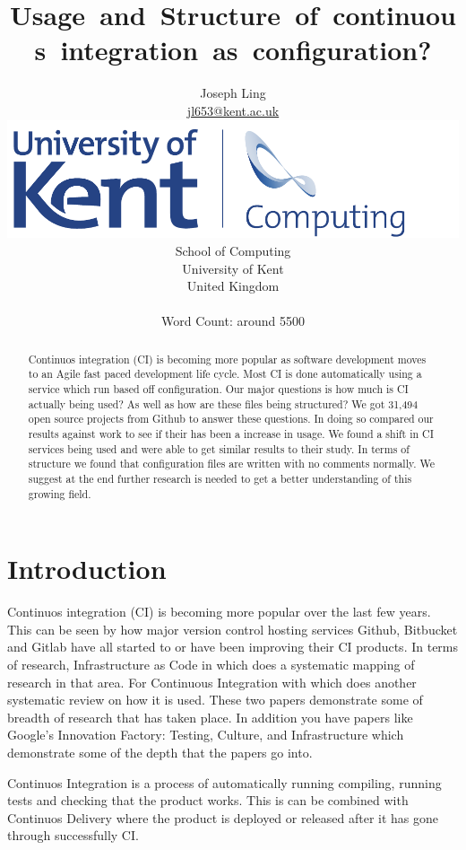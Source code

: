\documentclass[twoside,12pt,titlepage,a4paper]{article}
\title{Usage and Structure of continuous integration as configuration?}
\author{Joseph Ling\\\vspace{10mm}
\url{jl653@kent.ac.uk} \\ \vspace{5mm}
\includegraphics[scale=0.6]{Kent_Comp_294_RGB} \\
School of Computing \\
University of Kent \\
United Kingdom \\ \vspace{10mm} \\ Word Count: around 5500}
\begin{document}
\maketitle
\restoregeometry              %

\begin{abstract}
  Continuos integration (CI) is becoming more popular as software development moves to an Agile fast paced development life cycle. Most CI is done automatically using a service which run based off configuration. Our major questions is how much is CI actually being used? As well as how are these files being structured? We got 31,494 open source projects from Github to answer these questions. In doing so compared our results against \citet{Hilton2016} work to see if their has been a increase in usage. We found a shift in CI services being used and were able to get similar results to their study. In terms of structure we found that configuration files are written with no comments normally. We suggest at the end further research is needed to get a better understanding of this growing field.    
\end{abstract}

\section{Introduction}
\label{Introduction}

Continuos integration (CI) is becoming more popular over the last few years. This can be seen by how major version control hosting services Github, Bitbucket and Gitlab have all started to or have been improving their CI products. In terms of research, Infrastructure as Code in \citet{Rahman2019} which does a systematic mapping of research in that area. For Continuous Integration with \citet{Shahin2017} which does another systematic review on how it is used. These two papers demonstrate some of breadth of research that has taken place. In addition you have papers like Google's Innovation Factory: Testing, Culture, and Infrastructure \citet{Copeland2010} which demonstrate some of the depth that the papers go into.

Continuos Integration is a process of automatically running compiling, running tests and checking that the product works. This is can be combined with Continuos Delivery where the product is deployed or released after it has gone through successfully CI. 
\end{document}
